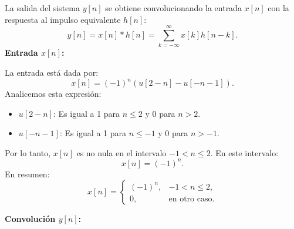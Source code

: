 \begin{enumerate}[label=\color{red}\textbf{\arabic*)}]
\begin{enumerate}[label=\textbf{Paso \arabic*:}]
            La salida del sistema $y[n]$ se obtiene convolucionando la entrada  $x[n]$ con la respuesta al impulso equivalente  $h[n]$: \[
                y[n]=x[n]\ast h[n]=\sum_{k=-\infty}^{\infty} x[k]h[n-k].
            \] 
            \textbf{Entrada $x[n]$:}

            La entrada está dada por: \[
                x[n]=(-1)^n(u[2-n]-u[-n-1]).
            \] 
            Analicemos esta expresión:
            \begin{itemize}[label=\textbullet]
                \item $u[2-n]$: Es igual a 1 para  $n\le 2$ y 0 para $n>2$.
                \item  $u[-n-1]$: Es igual a 1 para  $n\le -1$ y 0 para $n>-1$.
            \end{itemize}
            Por lo tanto, $x[n]$ es no nula en el intervalo  $-1< n\le 2$. En este intervalo: \[
                x[n]=(-1)^n.
            \] 
            En resumen: \[
                x[n]=\begin{cases}
                    (-1)^n, & -1<n\le 2,\\
                    0, & \text{en otro caso.}
                \end{cases}
            \] 
            \begin{center}
            \end{center}
            \textbf{Convolución $y[n]$:}


\end{enumerate}
\end{enumerate}
